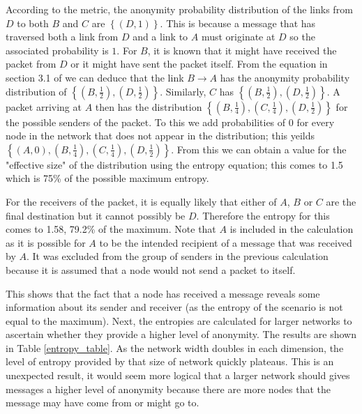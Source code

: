 \documentclass[ %
                    author={Luke Murray},
                supervisor={Dr. Simon Hollis},
                     title={Shadow Peer-to-Peer Networks},
                  subtitle={},
                    degree={MEng},
                      year={2013} ]{thesis}
\begin{document}
According to the metric, the anonymity probability distribution of the links from $D$ to both $B$ and $C$ are $\left\{(D, 1)\right\}$. This is because a message that has traversed both a link from $D$ and a link to $A$ must originate at $D$ so the associated probability is $1$. For $B$, it is known that it might have received the packet from $D$ or it might have sent the packet itself. From the equation in section 3.1 of \cite{serjantov2003towards} we can deduce that the link $B \rightarrow A$ has the anonymity probability distribution of $\left\{(B, \frac{1}{2}), (D, \frac{1}{2})\right\}$. Similarly, $C$ has $\left\{(B, \frac{1}{2}), (D, \frac{1}{2})\right\}$. A packet arriving at $A$ then has the distribution $\left\{(B, \frac{1}{4}), (C, \frac{1}{4}), (D, \frac{1}{2})\right\}$ for the possible senders of the packet. To this we add probabilities of 0 for every node in the network that does not appear in the distribution; this yeilds $\left\{(A, 0), (B, \frac{1}{4}), (C, \frac{1}{4}), (D, \frac{1}{2})\right\}$. From this we can obtain a value for the "effective size" of the distribution using the entropy equation; this comes to 1.5 which is 75\% of the possible maximum entropy.

For the receivers of the packet, it is equally likely that either of $A$, $B$ or $C$ are the final destination but it cannot possibly be $D$. Therefore the entropy for this comes to 1.58, 79.2\% of the maximum. Note that $A$ is included in the calculation as it is possible for $A$ to be the intended recipient of a message that was received by $A$. It was excluded from the group of senders in the previous calculation because it is assumed that a node would not send a packet to itself.

This shows that the fact that a node has received a message reveals some information about its sender and receiver (as the entropy of the scenario is not equal to the maximum). Next, the entropies are calculated for larger networks to ascertain whether they provide a higher level of anonymity. The results are shown in Table \ref{entropy_table}. As the network width doubles in each dimension, the level of entropy provided by that size of network quickly plateaus. This is an unexpected result, it would seem more logical that a larger network should gives messages a higher level of anonymity because there are more nodes that the message may have come from or might go to.

\end{document}
